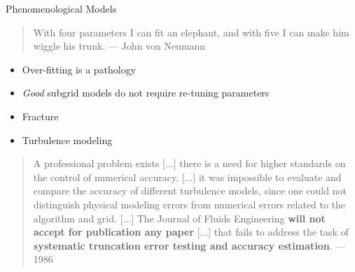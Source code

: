 \begin{frame}{Phenomenological Models}
  \begin{quote}
    With four parameters I can fit an elephant, and with five I can make him wiggle his trunk. --- John von Neumann
  \end{quote}
  \vspace{-1ex}
  \begin{multicols}{2}
    \begin{itemize}
    \item Over-fitting is a pathology
    \item \emph{Good} subgrid models do not require re-tuning parameters
    \item Fracture
    \item Turbulence modeling
    \end{itemize}
  \end{multicols}
  \begin{quote}
    A professional problem exists %
[...] there is a need for higher standards on the control of numerical accuracy. [...] it was impossible to evaluate and compare the accuracy of different turbulence models, since one could not distinguish physical modeling errors from numerical errors related to the algorithm and grid. [...] The Journal of Fluids Engineering {\bf will not accept for publication any paper}
[...] that fails to address the task of {\bf systematic truncation error testing and accuracy estimation}. --- 1986
  \end{quote}
\end{frame}

